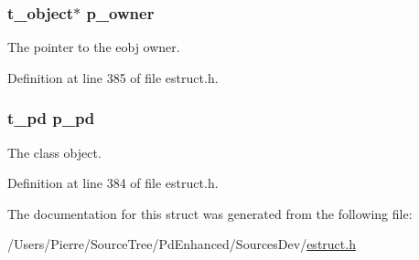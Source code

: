 \hypertarget{struct__eproxy_aafbddf848d70a14ab336be2b19cc535f}{
\subsubsection[{p\-\_\-owner}]{\setlength{\rightskip}{0pt plus 5cm}t\-\_\-object$\ast$ p\-\_\-owner}}\label{struct__eproxy_aafbddf848d70a14ab336be2b19cc535f}
The pointer to the eobj owner. 

Definition at line 385 of file estruct.\-h.

\hypertarget{struct__eproxy_a818a512bafab5b368d1fa0bca9872451}{
\subsubsection[{p\-\_\-pd}]{\setlength{\rightskip}{0pt plus 5cm}t\-\_\-pd p\-\_\-pd}}\label{struct__eproxy_a818a512bafab5b368d1fa0bca9872451}
The class object. 

Definition at line 384 of file estruct.\-h.



The documentation for this struct was generated from the following file\-:\begin{DoxyCompactItemize}
\item 
/\-Users/\-Pierre/\-Source\-Tree/\-Pd\-Enhanced/\-Sources\-Dev/\hyperlink{estruct_8h}{estruct.\-h}\end{DoxyCompactItemize}
